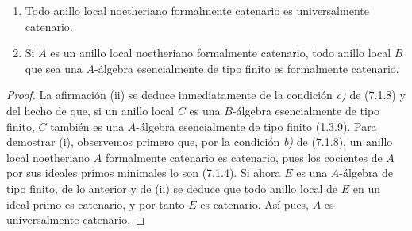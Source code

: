 \begin{proposition}[7.1.11]
\label{IV.2.s7.1.11-fr}
\begin{enumerate}
\item[\textup{(i)}] Todo anillo local noetheriano formalmente
catenario es universalmente catenario.
\item[\textup{(ii)}] Si $A$ es un anillo local noetheriano
formalmente catenario, todo anillo local $B$ que
sea una $A$-álgebra esencialmente de tipo finito
es formalmente catenario.
\end{enumerate}
\end{proposition}

\begin{proof}
La afirmación (ii) se deduce inmediatamente de la
condición \emph{c)} de (7.1.8) y del hecho de que, si un
anillo local $C$ es una $B$-álgebra esencialmente
de tipo finito, $C$ también es una $A$-álgebra
esencialmente de tipo finito (1.3.9).
Para demostrar (i), observemos primero que, por
la condición \emph{b)} de (7.1.8), un anillo local
noetheriano $A$ formalmente catenario es catenario,
pues los cocientes de $A$ por sus ideales primos
minimales lo son (7.1.4). Si ahora $E$ es una
$A$-álgebra de tipo finito, de lo anterior y de
(ii) se deduce que todo anillo local de $E$ en
un ideal primo es catenario, y por tanto $E$ es
catenario. Así pues, $A$ es universalmente
catenario.
\end{proof}
